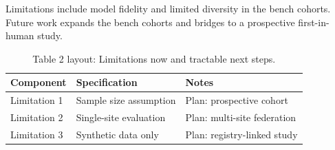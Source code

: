 
Limitations include model fidelity and limited diversity in the bench cohorts. Future work expands the bench cohorts and bridges to a prospective first-in-human study.

\begin{table}[H]
\caption{Table 2 layout: Limitations now and tractable next steps.}
\label{tab:limits_future}
\centering
\begin{tabular}{>{\raggedright\arraybackslash}p{3.4cm} >{\raggedright\arraybackslash}p{4.6cm} >{\raggedright\arraybackslash}p{5.4cm}}
\toprule
\textbf{Component} & \textbf{Specification} & \textbf{Notes} \\
\midrule
  Limitation 1 & Sample size assumption & Plan: prospective cohort \\
  Limitation 2 & Single-site evaluation & Plan: multi-site federation \\
  Limitation 3 & Synthetic data only & Plan: registry-linked study \\
\bottomrule
\end{tabular}
\end{table}
